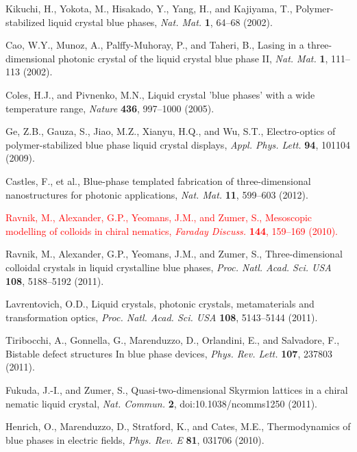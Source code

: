 \documentclass[12pt]{article}
\begin{document}
\begin{thebibliography}{99}
Kikuchi, H., Yokota, M., Hisakado, Y., Yang, H., and Kajiyama, T.,
Polymer-stabilized liquid crystal blue phases,
{\it Nat. Mat.} {\bf 1}, 64--68 (2002).

Cao, W.Y., Munoz, A., Palffy-Muhoray, P., and  Taheri, B.,
Lasing in a three-dimensional photonic crystal of the liquid crystal blue 
phase II,
{\it Nat. Mat.} {\bf 1}, 111--113 (2002).

Coles, H.J., and  Pivnenko, M.N.,
Liquid crystal 'blue phases' with a wide temperature range,
{\it Nature} {\bf 436}, 997--1000 (2005).

Ge, Z.B., Gauza, S., Jiao, M.Z., Xianyu, H.Q., and  Wu, S.T.,
 Electro-optics of polymer-stabilized blue phase liquid crystal displays,
{\it Appl. Phys. Lett.} {\bf 94}, 101104 (2009).

Castles, F., et al.,
Blue-phase templated fabrication of three-dimensional nanostructures for
photonic applications, {\it Nat. Mat.} {\bf 11}, 599--603 (2012).

\textcolor{red}{Ravnik, M., Alexander, G.P., Yeomans, J.M., and Zumer, S.,
Mesoscopic modelling of colloids in chiral nematics,
{\it Faraday Discuss.} {\bf 144}, 159--169 (2010).}

Ravnik, M., Alexander, G.P.,  Yeomans, J.M., and  Zumer, S.,
Three-dimensional colloidal crystals in liquid crystalline 
blue phases, {\it Proc. Natl. Acad. Sci. USA} {\bf 108}, 5188--5192 (2011).

 Lavrentovich, O.D.,
 Liquid crystals, photonic crystals, metamaterials and transformation optics, 
{\it Proc. Natl. Acad. Sci. USA} {\bf 108}, 5143--5144 (2011).

Tiribocchi, A., Gonnella, G., Marenduzzo, D., Orlandini, E., and Salvadore, F.,
Bistable defect structures In blue phase devices,
 {\it Phys. Rev. Lett.} {\bf 107}, 237803 (2011).

Fukuda, J.-I., and Zumer, S.,
Quasi-two-dimensional Skyrmion lattices in a chiral nematic liquid crystal,
{\it Nat. Commun.} {\bf 2}, doi:10.1038/ncomms1250 (2011).

Henrich, O., Marenduzzo, D., Stratford, K., and  Cates, M.E.,
Thermodynamics of blue phases in electric fields,
{\it Phys. Rev. E} {\bf 81}, 031706 (2010).


\end{thebibliography}
\end{document}
